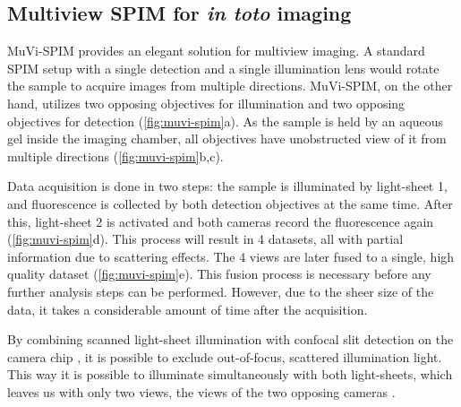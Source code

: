 \subsection{Multiview SPIM for \textit{in toto} imaging}

MuVi-SPIM  provides an elegant solution for multiview imaging. A standard SPIM setup with a single detection and a single illumination lens would rotate the sample to acquire images from multiple directions. MuVi-SPIM, on the other hand, utilizes two opposing objectives for illumination and two opposing objectives for detection (\autoref{fig:muvi-spim}a). As the sample is held by an aqueous gel inside the imaging chamber, all objectives have unobstructed view of it from multiple directions (\autoref{fig:muvi-spim}b,c).

Data acquisition is done in two steps: the sample is illuminated by light-sheet 1, and fluorescence is collected by both detection objectives at the same time. After this, light-sheet 2 is activated and both cameras record the fluorescence again (\autoref{fig:muvi-spim}d). This process will result in 4 datasets, all with partial information due to scattering effects. The 4 views are later fused to a single, high quality dataset (\autoref{fig:muvi-spim}e). This fusion process is necessary before any further analysis steps can be performed. However, due to the sheer size of the data, it takes a considerable amount of time after the acquisition.

By combining scanned light-sheet illumination \cite{keller_reconstruction_2008} with confocal slit detection on the camera chip \cite{baumgart_scanned_2012}, it is possible to exclude out-of-focus, scattered illumination light. This way it is  possible to illuminate simultaneously with both light-sheets, which leaves us with only two views, the views of the two opposing cameras \cite{de_medeiros_confocal_2015}.

